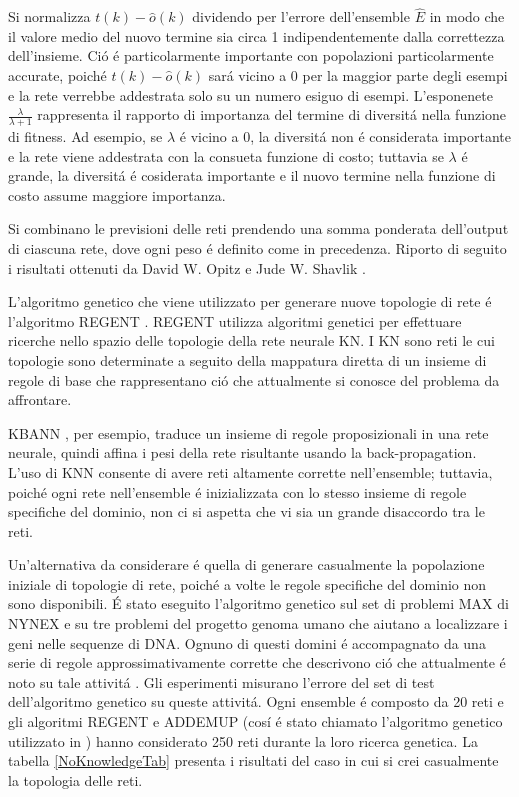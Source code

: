 \documentclass[a4paper,12pt]{report}
\begin{document}
  Si normalizza $t(k) - \widehat{o} (k)$ dividendo per l'errore dell'ensemble $\widehat{E}$ in modo che il valore medio del nuovo termine sia circa 1 indipendentemente dalla correttezza dell'insieme. 
  Ci\'o \'e particolarmente importante con popolazioni particolarmente accurate, poich\'e $t(k) - \widehat{o} (k)$ sar\'a vicino a 0 per la maggior parte degli esempi e la rete verrebbe addestrata solo su un numero esiguo di esempi. 
  L'esponenete $\frac{\lambda}{\lambda + 1}$ rappresenta il rapporto di importanza del termine di diversit\'a nella funzione di fitness. 
  Ad esempio, se $\lambda$ \'e vicino a 0, la diversit\'a non \'e considerata importante e la rete viene addestrata con la consueta funzione di costo; tuttavia se $\lambda$ \'e grande, la diversit\'a \'e cosiderata importante e il nuovo termine nella funzione di costo assume maggiore importanza. 
  
  Si combinano le previsioni delle reti prendendo una somma ponderata dell'output di ciascuna rete, dove ogni peso \'e definito come in precedenza. 
  Riporto di seguito i risultati ottenuti da David W. Opitz e Jude W. Shavlik \cite{opitz1994using}.
  
  L'algoritmo genetico che viene utilizzato per generare nuove topologie di rete \'e l'algoritmo REGENT \cite{opitz1994using}. 
  REGENT utilizza algoritmi genetici per effettuare ricerche nello spazio delle topologie della rete neurale KN. 
  I KN sono reti le cui topologie sono determinate a seguito della mappatura diretta di un insieme di regole di base che rappresentano ci\'o che attualmente si conosce del problema da affrontare. 
  
  KBANN \cite{towell1994knowledge}, per esempio, traduce un insieme di regole proposizionali in una rete neurale, quindi affina i pesi della rete risultante usando la back-propagation. 
  L'uso di KNN consente di avere reti altamente corrette nell'ensemble; tuttavia, poich\'e ogni rete nell'ensemble \'e inizializzata con lo stesso insieme di regole specifiche del dominio, non ci si aspetta che vi sia un grande disaccordo tra le reti. 
  
  Un'alternativa da considerare \'e quella di generare casualmente la popolazione iniziale di topologie di rete, poich\'e a volte le regole specifiche del dominio non sono disponibili.
  \'E stato eseguito l'algoritmo genetico sul set di problemi MAX di NYNEX e su tre problemi del progetto genoma umano che aiutano a localizzare i geni nelle sequenze di DNA. 
  Ognuno di questi domini \'e accompagnato da una serie di regole approssimativamente corrette che descrivono ci\'o che attualmente \'e noto su tale attivit\'a \cite{opitz1995anytime} \cite{opitz1994using}. 
  Gli esperimenti misurano l'errore del set di test dell'algoritmo genetico su queste attivit\'a. 
  Ogni ensemble \'e composto da 20 reti e gli algoritmi REGENT e ADDEMUP (cos\'i \'e stato chiamato l'algoritmo genetico utilizzato in \cite{opitz1996generating}) hanno considerato 250 reti durante la loro ricerca genetica. 
  La tabella \ref{NoKnowledgeTab} presenta i risultati del caso in cui si crei casualmente la topologia delle reti. 
  
\end{document}
